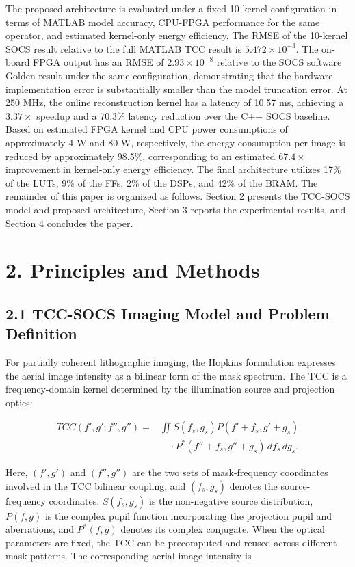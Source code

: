 \documentclass[
  preprint]{elsarticle}
\begin{document}
The proposed architecture is evaluated under a fixed 10-kernel
configuration in terms of MATLAB model accuracy, CPU-FPGA performance
for the same operator, and estimated kernel-only energy efficiency. The
RMSE of the 10-kernel SOCS result relative to the full MATLAB TCC result
is \(5.472\times10^{-3}\). The on-board FPGA output has an RMSE of
\(2.93\times10^{-8}\) relative to the SOCS software Golden result under
the same configuration, demonstrating that the hardware implementation
error is substantially smaller than the model truncation error. At 250
MHz, the online reconstruction kernel has a latency of 10.57 ms,
achieving a \(3.37\times\) speedup and a 70.3\% latency reduction over
the C++ SOCS baseline. Based on estimated FPGA kernel and CPU power
consumptions of approximately 4 W and 80 W, respectively, the energy
consumption per image is reduced by approximately 98.5\%, corresponding
to an estimated \(67.4\times\) improvement in kernel-only energy
efficiency. The final architecture utilizes 17\% of the LUTs, 9\% of the
FFs, 2\% of the DSPs, and 42\% of the BRAM. The remainder of this paper
is organized as follows. Section 2 presents the TCC-SOCS model and
proposed architecture, Section 3 reports the experimental results, and
Section 4 concludes the paper.

\section{2. Principles and Methods}\label{principles-and-methods}

\subsection{2.1 TCC-SOCS Imaging Model and Problem
Definition}\label{tcc-socs-imaging-model-and-problem-definition}

For partially coherent lithographic imaging, the Hopkins formulation
expresses the aerial image intensity as a bilinear form of the mask
spectrum. The TCC is a frequency-domain kernel determined by the
illumination source and projection optics:

\[
\begin{aligned}
TCC(f',g';f'',g'')={}&\iint S(f_s,g_s)P(f'+f_s,g'+g_s)\\
&\quad\cdot P^*(f''+f_s,g''+g_s)\,df_s\,dg_s.
\end{aligned}
\tag{1}
\]

Here, \((f',g')\) and \((f'',g'')\) are the two sets of mask-frequency
coordinates involved in the TCC bilinear coupling, and \((f_s,g_s)\)
denotes the source-frequency coordinates. \(S(f_s,g_s)\) is the
non-negative source distribution, \(P(f,g)\) is the complex pupil
function incorporating the projection pupil and aberrations, and
\(P^*(f,g)\) denotes its complex conjugate. When the optical parameters
are fixed, the TCC can be precomputed and reused across different mask
patterns. The corresponding aerial image intensity is
\end{document}

